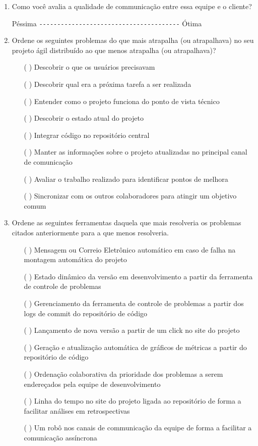 \begin{enumerate}
\item Como você avalia a qualidade de communicação entre essa equipe e
  o cliente?

  Péssima \verb=---------------------------------------= Ótima

\item Ordene os seguintes problemas do que mais atrapalha (ou
  atrapalhava) no seu projeto ágil distribuído ao que menos
  atrapalha (ou atrapalhava)?
  \begin{itemize}
  \item[( )] Descobrir o que os usuários precisavam
  \item[( )] Descobrir qual era a próxima tarefa a ser realizada
  \item[( )] Entender como o projeto funciona do ponto de vista técnico
  \item[( )] Descobrir o estado atual do projeto
  \item[( )] Integrar código no repositório central
  \item[( )] Manter as informações sobre o projeto atualizadas no
    principal canal de comunicação
  \item[( )] Avaliar o trabalho realizado para identificar pontos de
    melhora
  \item[( )] Sincronizar com os outros colaboradores para atingir um
    objetivo comum
  \end{itemize}

\item Ordene as seguintes ferramentas daquela que mais resolveria os
  problemas citados anteriormente para a que menos resolveria.
  \begin{itemize}
  \item[( )] Mensagem ou Correio Eletrônico automático em caso de
    falha na montagem automática do projeto
  \item[( )] Estado dinâmico da versão em desenvolvimento a partir da
    ferramenta de controle de problemas
  \item[( )] Gerenciamento da ferramenta de controle de problemas a
    partir dos logs de commit do repositório de código
  \item[( )] Lançamento de nova versão a partir de um click no site do
    projeto
  \item[( )] Geração e atualização automática de gráficos de métricas
    a partir do repositório de código
  \item[( )] Ordenação colaborativa da prioridade dos problemas a
    serem endereçados pela equipe de desenvolvimento
  \item[( )] Linha do tempo no site do projeto ligada ao repositório
    de forma a facilitar análises em retrospectivas
  \item[( )] Um robô nos canais de communicação da equipe de forma a
    facilitar a comunicação assíncrona
  \end{itemize}


\end{enumerate}
